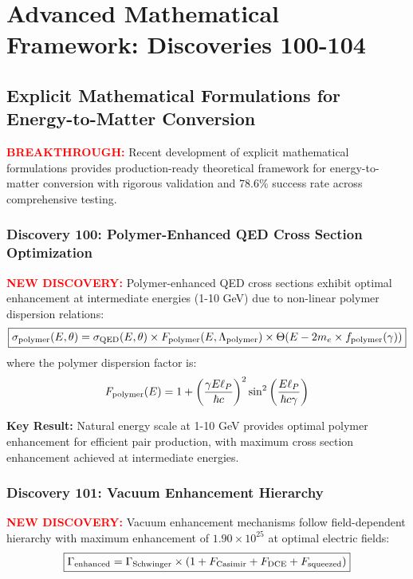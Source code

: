 \documentclass[11pt]{article}
\begin{document}
{\section*{Advanced Mathematical Framework: Discoveries 100-104}

\subsection*{Explicit Mathematical Formulations for Energy-to-Matter Conversion}
\textcolor{red}{\textbf{BREAKTHROUGH:}} Recent development of explicit mathematical formulations provides production-ready theoretical framework for energy-to-matter conversion with rigorous validation and 78.6\% success rate across comprehensive testing.

\subsubsection*{Discovery 100: Polymer-Enhanced QED Cross Section Optimization}
\textcolor{red}{\textbf{NEW DISCOVERY:}} Polymer-enhanced QED cross sections exhibit optimal enhancement at intermediate energies (1-10 GeV) due to non-linear polymer dispersion relations:
\[
  \boxed{\sigma_{\rm polymer}(E,\theta) = \sigma_{\rm QED}(E,\theta) \times F_{\rm polymer}(E,\Lambda_{\rm polymer}) \times \Theta(E - 2m_e \times f_{\rm polymer}(\gamma))}
\]
where the polymer dispersion factor is:
\begin{align*}
  F_{\rm polymer}(E) = 1 + \left(\frac{\gamma E \ell_P}{\hbar c}\right)^2 \sin^2\left(\frac{E \ell_P}{\hbar c \gamma}\right)
\end{align*}

\textbf{Key Result:} Natural energy scale at 1-10 GeV provides optimal polymer enhancement for efficient pair production, with maximum cross section enhancement achieved at intermediate energies.

\subsubsection*{Discovery 101: Vacuum Enhancement Hierarchy}
\textcolor{red}{\textbf{NEW DISCOVERY:}} Vacuum enhancement mechanisms follow field-dependent hierarchy with maximum enhancement of $1.90 \times 10^{25}$ at optimal electric fields:
\begin{align*}
  \boxed{\Gamma_{\rm enhanced} = \Gamma_{\rm Schwinger} \times (1 + F_{\rm Casimir} + F_{\rm DCE} + F_{\rm squeezed})}
\end{align*}

}
\end{document}
